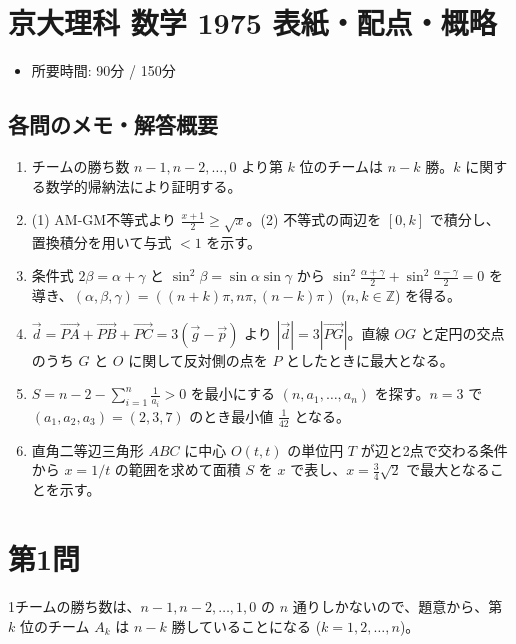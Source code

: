 \documentclass[../main.tex]{subfiles}
\begin{document}
\section*{京大理科 数学 1975 表紙・配点・概略}

\begin{itemize}
  \item 所要時間: 90分 / 150分
\end{itemize}

\subsection*{各問のメモ・解答概要}
\begin{enumerate}
  \item チームの勝ち数 $n-1, n-2, \dots, 0$ より第 $k$ 位のチームは $n-k$ 勝。$k$ に関する数学的帰納法により証明する。
  \item (1) AM-GM不等式より $\frac{x+1}{2} \ge \sqrt{x}$。(2) 不等式の両辺を $[0,k]$ で積分し、置換積分を用いて与式 $< 1$ を示す。
  \item 条件式 $2\beta = \alpha + \gamma$ と $\sin^2\beta = \sin\alpha \sin\gamma$ から $\sin^2\frac{\alpha+\gamma}{2} + \sin^2\frac{\alpha-\gamma}{2} = 0$ を導き、$(\alpha, \beta, \gamma) = ((n+k)\pi, n\pi, (n-k)\pi)$ ($n, k \in \mathbb{Z}$) を得る。
  \item $\vec{d} = \vec{PA} + \vec{PB} + \vec{PC} = 3(\vec{g} - \vec{p})$ より $|\vec{d}| = 3|\vec{PG}|$。直線 $OG$ と定円の交点のうち $G$ と $O$ に関して反対側の点を $P$ としたときに最大となる。
  \item $S = n-2 - \sum_{i=1}^n \frac{1}{a_i} > 0$ を最小にする $(n, a_1, \dots, a_n)$ を探す。$n=3$ で $(a_1, a_2, a_3) = (2, 3, 7)$ のとき最小値 $\frac{1}{42}$ となる。
  \item 直角二等辺三角形 $ABC$ に中心 $O(t,t)$ の単位円 $T$ が辺と2点で交わる条件から $x=1/t$ の範囲を求めて面積 $S$ を $x$ で表し、$x = \frac{3}{4}\sqrt{2}$ で最大となることを示す。
\end{enumerate}

\newpage

\section*{第1問}

\noindent
[\textbf{解}] 1チームの勝ち数は、$n-1, n-2, \dots, 1, 0$ の $n$ 通りしかないので、題意から、第 $k$ 位のチーム $A_k$ は $n-k$ 勝していることになる ($k=1, 2, \dots, n$)。
\end{document}
